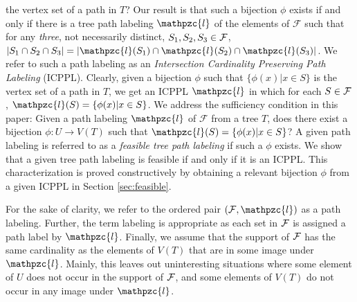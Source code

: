 \documentclass[envcountsect, envcountsame, 11pt]{../lib/llncs2e/llncs}
\def\cF{{\cal F}}
\def\F{{\mathcal F}}
\def\cl{\mathpzc{l}}
\begin{document}
the vertex set of a path in $T$?  
 Our result is that such a bijection $\phi$ exists if and only if
there is a tree path labeling $\cl$ of the elements of $\F$ such that for any  {\em three}, not necessarily distinct, $S_1, S_2, S_3 \in \cF$, $|S_1 \cap S_2 \cap S_3|=|\cl(S_1) \cap \cl(S_2) \cap \cl(S_3)|$.   We refer to such a path labeling as an {\em Intersection Cardinality Preserving
Path Labeling} (ICPPL).   
Clearly, given a bijection $\phi$ such that $\{\phi(x) | x \in S\}$ is
the vertex set of a path in $T$, we get an ICPPL $\cl$ in which for each $S \in \cF$, $\cl(S) = \{\phi(x) | x \in S\}$.  We address the sufficiency condition in this paper: Given a path labeling $\cl$ of $\F$ from a tree $T$, does there exist a bijection 
$\phi:U \rightarrow V(T)$ such that $\cl(S) = \{\phi(x) | x \in S\}$?  A given path labeling is referred to as a {\em feasible tree path labeling} if such a $\phi$
exists.  
We show that a given tree path labeling is feasible if and only if it is an ICPPL.
This characterization is proved constructively by obtaining a relevant bijection $\phi$ from a given ICPPL in Section \ref{sec:feasible}.  
\begin{comment}
This generalizes the characterization of matrices that have the COP in \cite{nsnrs09}.  
We then consider the complexity of finding an ICPPL for a given family $\cF$
in a given tree $T$ in Section \ref{sec:ksubdivstar}.    In the case when $T$ is a path, this is exactly the problem of testing for a COP that is well-known to be polynomial time solvable, also known to be in Deterministic Logspace \cite{kklv10}.  We consider the case of a {\em $k$-subdivided star} which is a special kind of a tree.  
By extending the algorithmic technique of testing for an ICPPL in a path, we present a polynomial time algorithm to test for the existence of an ICPPL in a $k$-subdivided star for given family $\cF$ which is restricted in two ways (see Section \ref{sec:ksubdivstar}).
The complexity of finding an ICPPL for arbitrary trees is open to the best of our knowledge, and we feel that it could have the same flavor of Graph Isomorphism. Among many other things we do not know of a co-NP algorithm for deciding the existence of an ICPPL.  
\end{comment}
 For the sake of clarity, we refer to the ordered pair $(\cF,\cl)$ as a path labeling.  Further, the term labeling is appropriate as each set in $\cF$ is assigned a path label by $\cl$.  Finally, we assume that the support of $\cF$ has the same cardinality as the elements of $V(T)$ that are in some image under $\cl$.  Mainly, this leaves out 
uninteresting situations where some element of $U$ does not occur in the support of $\cF$, and some elements of $V(T)$ do not
occur in any image under $\cl$.  
\end{document}
